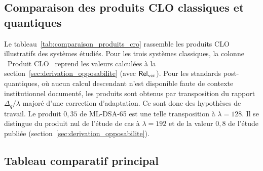 \subsection{Comparaison des produits CLO classiques et quantiques}
\label{sec:comparaison_produits_cro}
\begin{sloppypar}

Le tableau~\ref{tab:comparaison_produits_cro} rassemble les produits CLO
illustratifs des syst\`emes \'etudi\'es. Pour les trois syst\`emes classiques,
la colonne \guillemotleft~Produit CLO~\guillemotright{} reprend les valeurs
calcul\'ees \`a la section~\ref{sec:derivation_opposabilite} (avec $\mathsf{Rel}_{\mathrm{ver}}$).
Pour les standards post-quantiques, o\`u aucun calcul descendant n'est
disponible faute de contexte institutionnel document\'e, les produits sont
obtenus par transposition du rapport $\Delta_q/\lambda$ major\'e d'une correction
d'adaptation. Ce sont donc des hypoth\`eses de travail. Le produit $0{,}35$ de ML-DSA-65 est une telle
transposition \`a $\lambda = 128$. Il se distingue du produit nul de l'\'etude de cas \`a $\lambda = 192$
et de la valeur $0{,}8$ de l'\'etude publi\'ee (section~\ref{sec:derivation_opposabilite}).

\subsection{Tableau comparatif principal}
\label{sec:tableau_comparatif_principal}


\end{sloppypar}
